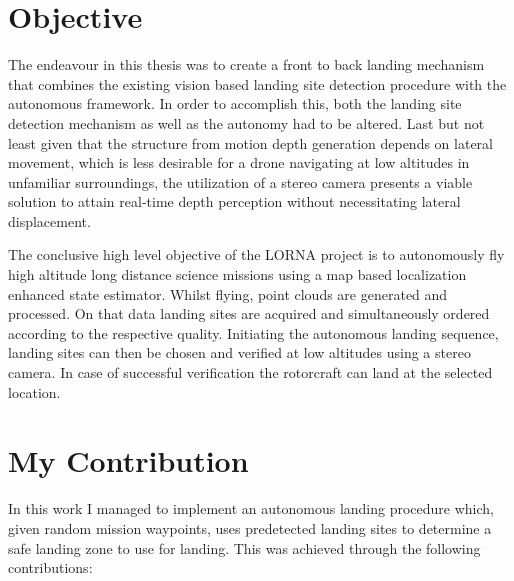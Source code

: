 



\section{Objective}

The endeavour in this thesis was to create a front to back landing mechanism that combines the existing vision based landing site detection procedure with the autonomous framework. In order to accomplish this, both the landing site detection mechanism as well as the autonomy had to be altered. Last but not least given that the structure from motion depth generation depends on lateral movement, which is less desirable for a drone navigating at low altitudes in unfamiliar surroundings, the utilization of a stereo camera presents a viable solution to attain real-time depth perception without necessitating lateral displacement.

The conclusive high level objective of the LORNA project is to autonomously fly high altitude long distance science missions using a map based localization enhanced state estimator. Whilst flying, point clouds are generated and processed. On that data landing sites are acquired and simultaneously ordered according to the respective quality. Initiating the autonomous landing sequence, landing sites can then be chosen and verified at low altitudes using a stereo camera. In case of successful verification the rotorcraft can land at the selected location. 

\section{My Contribution}
In this work I managed to implement an autonomous landing procedure which, given random mission waypoints, uses predetected landing sites to determine a safe landing zone to use for landing. This was achieved through the following contributions:

